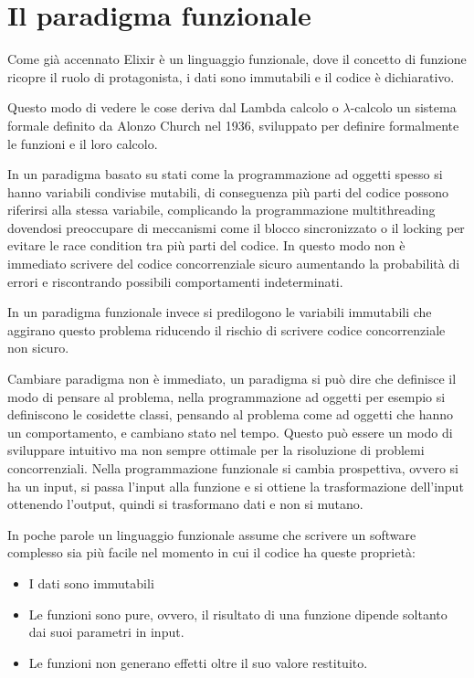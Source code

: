\section{Il paradigma funzionale}
\renewcommand\lstlistingname{Esempio}
Come già accennato Elixir è un linguaggio funzionale, dove
il concetto di funzione ricopre il ruolo di protagonista,
i dati sono immutabili e il codice è dichiarativo.

Questo modo di vedere le cose deriva dal Lambda calcolo o $\lambda$-calcolo
\cite{Lambdaca75:online}
un sistema formale definito da Alonzo Church nel 1936, sviluppato
per definire formalmente le funzioni e il loro calcolo.

In un paradigma basato su stati come la programmazione ad oggetti
spesso si hanno variabili condivise mutabili, di conseguenza più parti del codice
possono riferirsi alla stessa variabile, complicando la programmazione
multithreading dovendosi preoccupare di meccanismi come il blocco
sincronizzato o il locking per evitare le race condition tra più parti
del codice. In questo modo non è immediato scrivere
del codice concorrenziale sicuro aumentando la probabilità di errori e
riscontrando possibili comportamenti indeterminati.

In un paradigma funzionale invece si predilogono le variabili immutabili che
aggirano questo problema riducendo il rischio di scrivere codice
concorrenziale non sicuro.

Cambiare paradigma non è immediato, un paradigma si può dire che
definisce il modo di pensare al problema, nella programmazione ad
oggetti per esempio si definiscono le cosidette classi,
pensando al problema come ad oggetti che hanno un comportamento,
e cambiano stato nel tempo.
Questo può essere un modo di sviluppare intuitivo ma non sempre
ottimale per la risoluzione di problemi concorrenziali.
Nella programmazione funzionale
si cambia prospettiva, ovvero si ha un input, si passa l'input 
alla funzione e si ottiene la trasformazione dell'input ottenendo
l'output, quindi si trasformano dati e non si mutano.

In poche parole un linguaggio funzionale assume che scrivere un
software complesso sia più facile nel momento in cui il codice ha
queste proprietà:
\begin{itemize}
    \item I dati sono immutabili
    \item Le funzioni sono pure, ovvero, il risultato di una funzione
    dipende soltanto dai suoi parametri in input.
    \item Le funzioni non generano effetti oltre il suo valore restituito.
\end{itemize}

